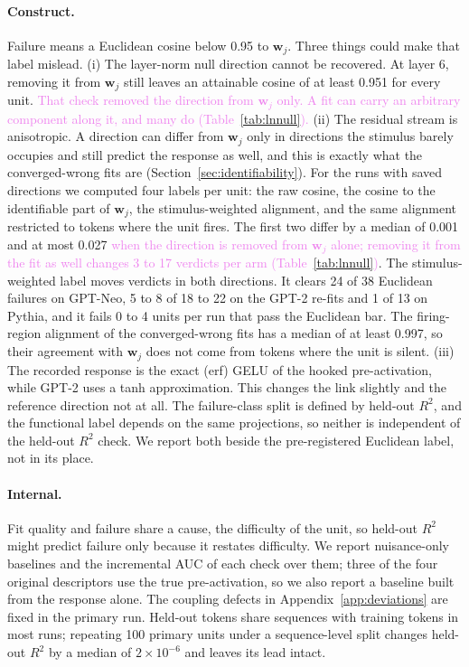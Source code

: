 \documentclass[10pt]{article}
\newcommand{\draft}[1]{\textcolor{violet}{#1}}
\begin{document}
\paragraph{Construct.} Failure means a Euclidean cosine below 0.95 to $\mathbf{w}_j$. Three
things could make that label mislead.
(i) The layer-norm null direction cannot be recovered. At layer 6, removing it from
$\mathbf{w}_j$ still leaves an attainable cosine of at least 0.951 for every unit. \draft{That check removed the direction from $\mathbf{w}_j$ only. A fit can
carry an arbitrary component along it, and many do (Table~\ref{tab:lnnull}).}
(ii) The residual stream is anisotropic. A direction can differ from $\mathbf{w}_j$ only in
directions the stimulus barely occupies and still predict the response as well, and this is
exactly what the converged-wrong fits are (Section~\ref{sec:identifiability}). For the runs with
saved directions we computed four labels per unit: the raw cosine, the cosine to the
identifiable part of $\mathbf{w}_j$, the stimulus-weighted alignment, and the same alignment
restricted to tokens where the unit fires. The first two differ by a median of 0.001 and at
most 0.027 \draft{when the direction is removed from $\mathbf{w}_j$ alone; removing it from the
fit as well changes 3 to 17 verdicts per arm (Table~\ref{tab:lnnull})}. The stimulus-weighted
label moves verdicts in both directions. It clears 24 of 38 Euclidean failures on GPT-Neo, 5 to
8 of 18 to 22 on the GPT-2 re-fits and 1 of 13 on Pythia, and it fails 0 to 4 units per run that
pass the Euclidean bar. The firing-region alignment of the converged-wrong fits has a median of
at least 0.997, so their agreement with $\mathbf{w}_j$ does not come from tokens where the unit is
silent.
(iii) The recorded response is the exact (erf) GELU of the hooked pre-activation, while
GPT-2 uses a tanh approximation. This changes the link slightly and the reference direction
not at all.
The failure-class split is defined by held-out $R^2$, and the functional label depends on
the same projections, so neither is independent of the held-out $R^2$ check. We report both
beside the pre-registered Euclidean label, not in its place.
\paragraph{Internal.} Fit quality and failure share a cause, the difficulty of the unit, so
held-out $R^2$ might predict failure only because it restates difficulty. We report nuisance-only baselines
and the incremental AUC of each check over them; three of the four original descriptors use
the true pre-activation, so we also report a baseline built from the response alone. The coupling defects in
Appendix~\ref{app:deviations} are fixed in the primary run. Held-out tokens share sequences
with training tokens in most runs; repeating 100 primary units under a sequence-level split
changes held-out $R^2$ by a median of $2\times10^{-6}$ and leaves its lead intact.
\end{document}

